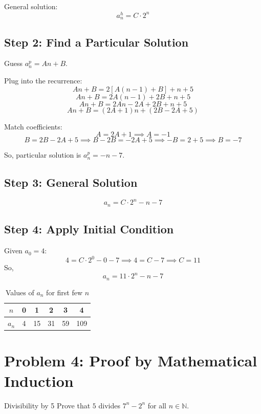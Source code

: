 \documentclass[14pt,a4paper]{article}
\begin{document}
General solution:
\[
a_n^h = C \cdot 2^n
\]

\subsection*{Step 2: Find a Particular Solution}
Guess $a_n^p = An + B$.

Plug into the recurrence:
\[
An + B = 2[A(n-1) + B] + n + 5
\]
\[
An + B = 2A(n-1) + 2B + n + 5
\]
\[
An + B = 2A n - 2A + 2B + n + 5
\]
\[
An + B = (2A + 1) n + (2B - 2A + 5)
\]

Match coefficients:
\[
A = 2A + 1 \implies A = -1
\]
\[
B = 2B - 2A + 5 \implies B - 2B = -2A + 5 \implies -B = 2 + 5 \implies B = -7
\]

So, particular solution is $a_n^p = -n - 7$.

\subsection*{Step 3: General Solution}
\[
a_n = C \cdot 2^n - n - 7
\]

\subsection*{Step 4: Apply Initial Condition}
Given $a_0 = 4$:
\[
4 = C \cdot 2^0 - 0 - 7 \implies 4 = C - 7 \implies C = 11
\]
So,
\[
\boxed{
a_n = 11 \cdot 2^n - n - 7
}
\]

\vspace{1em}
\begin{table}[h!]
    \centering
    \caption{Values of $a_n$ for first few $n$}
    \begin{tabular}{cccccc}
        \toprule
        $n$ & 0 & 1 & 2 & 3 & 4 \\
        \midrule
        $a_n$ & 4 & 15 & 31 & 59 & 109 \\
        \bottomrule
    \end{tabular}
\end{table}


\section*{Problem 4: Proof by Mathematical Induction}

\begin{myproblem}{Divisibility by 5}
Prove that $5$ divides $7^n - 2^n$ for all $n \in \mathbb{N}$.
\end{myproblem}
\end{document}

